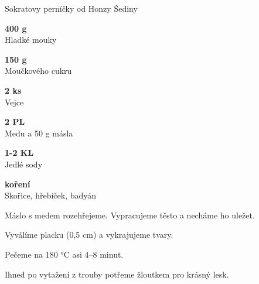 \documentclass[11pt,a4paper]{article}
\begin{document}
\begin{recipe}[Sienna]{Sokratovy perníčky od Honzy Šediny}
    \begin{ingredients}
        \item \parbox[t]{\linewidth}{\raggedright \weight \textbf{400 g}\\ Hladké mouky}
        \item \parbox[t]{\linewidth}{\raggedright \weight \textbf{150 g}\\ Moučkového cukru}
        \item \parbox[t]{\linewidth}{\raggedright \piece \textbf{2 ks}\\ Vejce}
        \item \parbox[t]{\linewidth}{\raggedright \spoon \textbf{2 PL}\\ Medu a 50 g másla}
        \item \parbox[t]{\linewidth}{\raggedright \spoon \textbf{1-2 KL}\\ Jedlé sody}
        \item \parbox[t]{\linewidth}{\raggedright \indefinite \textbf{koření}\\ Skořice, hřebíček, badyán}
    \end{ingredients}
    \begin{steps}
        \item Máslo s medem rozehřejeme. Vypracujeme těsto a necháme ho uležet.
        \item Vyválíme placku (0,5 cm) a vykrajujeme tvary.
        \item Pečeme na 180 °C asi 4–8 minut.
        \item Ihned po vytažení z trouby potřeme žloutkem pro krásný lesk.
    \end{steps}
\end{recipe}

\end{document}
